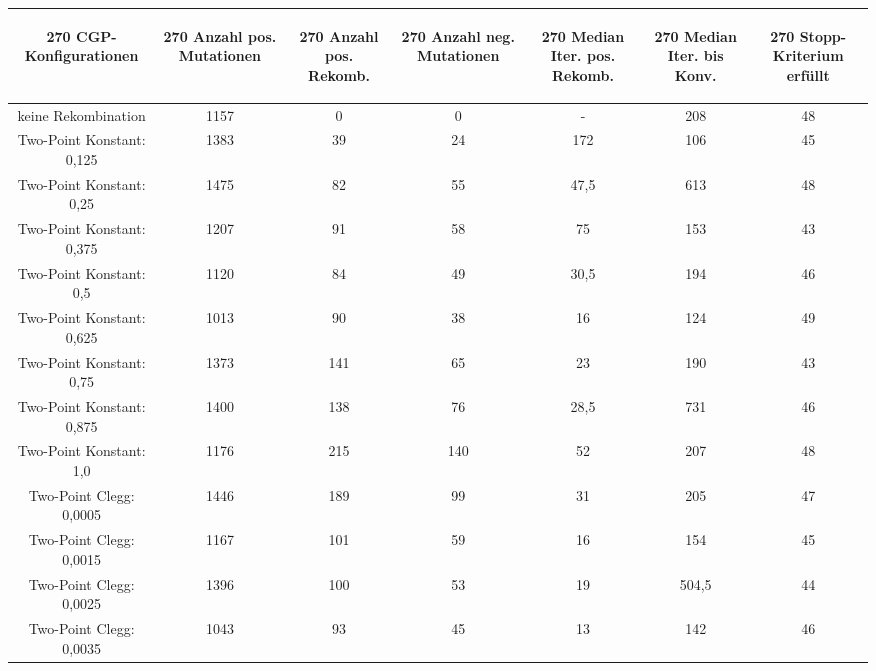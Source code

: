 \begin{table}[H]
	\centering
	\begin{tabular}{c | c | c | c | c | c | c}
		\begin{turn}{270} \textbf{CGP-Konfigurationen} \end{turn} & \begin{turn}{270} \textbf{Anzahl pos. Mutationen} \end{turn} & \begin{turn}{270} \textbf{Anzahl pos. Rekomb.} \end{turn} & \begin{turn}{270} \textbf{Anzahl neg. Mutationen} \end{turn} & \begin{turn}{270} \textbf{Median Iter. pos. Rekomb.} \end{turn} & \begin{turn}{270} \textbf{Median Iter. bis Konv.} \end{turn} & \begin{turn}{270} \textbf{Stopp-Kriterium erfüllt} \end{turn}\\
		\hline
		keine Rekombination & 1157 & 0 & 0 & - & 208 & 48\\
		\hline
		Two-Point Konstant: 0,125 & 1383 & 39 & 24 & 172 & 106 & 45\\
		\hline
		Two-Point Konstant: 0,25 & 1475 & 82 & 55 & 47,5 & 613 & 48\\
		\hline
		Two-Point Konstant: 0,375 & 1207 & 91 & 58 & 75 & 153 & 43\\
		\hline
		Two-Point Konstant: 0,5 & 1120 & 84 & 49 & 30,5 & 194 & 46\\
		\hline
		Two-Point Konstant: 0,625 & 1013 & 90 & 38 & 16 & 124 & 49\\
		\hline
		Two-Point Konstant: 0,75 & 1373 & 141 & 65 & 23 & 190 & 43\\
		\hline
		Two-Point Konstant: 0,875 & 1400 & 138 & 76 & 28,5 & 731 & 46\\
		\hline
		Two-Point Konstant: 1,0 & 1176 & 215 & 140 & 52 & 207 & 48\\
		\hline
		Two-Point Clegg: 0,0005 & 1446 & 189 & 99 & 31 & 205 & 47\\
		\hline
		Two-Point Clegg: 0,0015 & 1167 & 101 & 59 & 16 & 154 & 45\\
		\hline
		Two-Point Clegg: 0,0025 & 1396 & 100 & 53 & 19 & 504,5 & 44\\
		\hline
		Two-Point Clegg: 0,0035 & 1043 & 93 & 45 & 13 & 142 & 46\\

\end{tabular}
\end{table}

